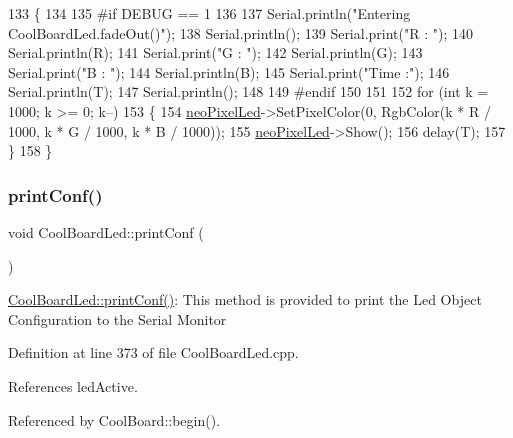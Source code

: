 \begin{DoxyCode}
133 \{
134 
135 \textcolor{preprocessor}{#if DEBUG == 1 }
136 
137     Serial.println(\textcolor{stringliteral}{"Entering CoolBoardLed.fadeOut()"});
138     Serial.println();
139     Serial.print(\textcolor{stringliteral}{"R : "});
140     Serial.println(R);
141     Serial.print(\textcolor{stringliteral}{"G : "});
142     Serial.println(G);
143     Serial.print(\textcolor{stringliteral}{"B : "});
144     Serial.println(B);
145     Serial.print(\textcolor{stringliteral}{"Time :"});
146     Serial.println(T);
147     Serial.println();
148 
149 \textcolor{preprocessor}{#endif  }
150 
151 
152     \textcolor{keywordflow}{for} (\textcolor{keywordtype}{int} k = 1000; k >= 0; k--) 
153     \{
154         \hyperlink{classCoolBoardLed_ac2c13fa462a010cd9242bf297c013923}{neoPixelLed}->SetPixelColor(0, RgbColor(k * R / 1000, k * G / 1000, k * B / 1000));
155         \hyperlink{classCoolBoardLed_ac2c13fa462a010cd9242bf297c013923}{neoPixelLed}->Show();
156         delay(T);
157     \}
158 \}
\end{DoxyCode}
\mbox{\label{classCoolBoardLed_a8ed3053a36f0ed4a131f43b5b17efb61}} 
\subsubsection{\texorpdfstring{print\+Conf()}{printConf()}}
{\footnotesize\ttfamily void Cool\+Board\+Led\+::print\+Conf (\begin{DoxyParamCaption}{ }\end{DoxyParamCaption})}

\hyperlink{classCoolBoardLed_a8ed3053a36f0ed4a131f43b5b17efb61}{Cool\+Board\+Led\+::print\+Conf()}\+: This method is provided to print the Led Object Configuration to the Serial Monitor 

Definition at line 373 of file Cool\+Board\+Led.\+cpp.



References led\+Active.



Referenced by Cool\+Board\+::begin().


